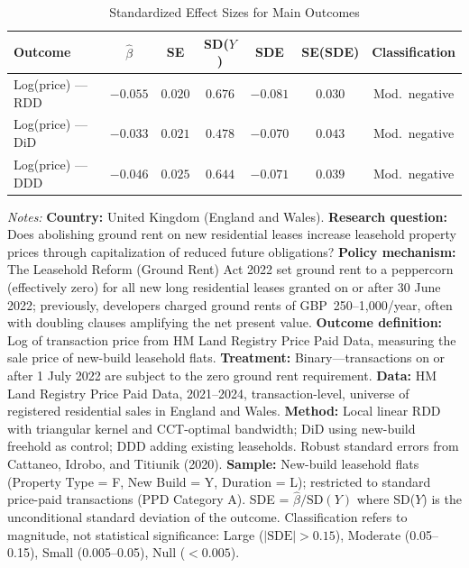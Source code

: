 \begin{table}[htbp]
\centering
\caption{Standardized Effect Sizes for Main Outcomes}
\label{tab:sde}
\small
\begin{minipage}{\textwidth}
\begin{tabular}{@{}lcccccc@{}}
\toprule
Outcome & $\hat{\beta}$ & SE & SD($Y$) & SDE & SE(SDE) & Classification \\
\midrule
Log(price) --- RDD & $-0.055$ & $0.020$ & $0.676$ & $-0.081$ & $0.030$ & Mod.\ negative \\
Log(price) --- DiD & $-0.033$ & $0.021$ & $0.478$ & $-0.070$ & $0.043$ & Mod.\ negative \\
Log(price) --- DDD & $-0.046$ & $0.025$ & $0.644$ & $-0.071$ & $0.039$ & Mod.\ negative \\
\bottomrule
\end{tabular}

\vspace{0.3em}
{\footnotesize \textit{Notes:}
\textbf{Country:} United Kingdom (England and Wales).
\textbf{Research question:} Does abolishing ground rent on new residential leases
increase leasehold property prices through capitalization of reduced future obligations?
\textbf{Policy mechanism:} The Leasehold Reform (Ground Rent) Act 2022 set ground rent
to a peppercorn (effectively zero) for all new long residential leases granted on or after
30 June 2022; previously, developers charged ground rents of GBP~250--1,000/year,
often with doubling clauses amplifying the net present value.
\textbf{Outcome definition:} Log of transaction price from HM Land Registry Price Paid Data,
measuring the sale price of new-build leasehold flats.
\textbf{Treatment:} Binary---transactions on or after 1 July 2022 are subject to the
zero ground rent requirement.
\textbf{Data:} HM Land Registry Price Paid Data, 2021--2024, transaction-level,
universe of registered residential sales in England and Wales.
\textbf{Method:} Local linear RDD with triangular kernel and CCT-optimal bandwidth;
DiD using new-build freehold as control; DDD adding existing leaseholds.
Robust standard errors from Cattaneo, Idrobo, and Titiunik (2020).
\textbf{Sample:} New-build leasehold flats (Property Type = F, New Build = Y, Duration = L);
restricted to standard price-paid transactions (PPD Category A).
SDE = $\hat{\beta} / \text{SD}(Y)$ where SD($Y$) is the unconditional standard deviation
of the outcome.
Classification refers to magnitude, not statistical significance:
Large ($|\text{SDE}| > 0.15$),
Moderate (0.05--0.15),
Small (0.005--0.05),
Null ($< 0.005$).}
\end{minipage}
\end{table}
